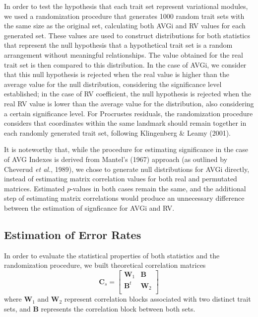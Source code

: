 \documentclass[11pt,twoside]{report}
\begin{document}
In order to test the hypothesis that each trait set represent
variational modules, we used a randomization procedure that generates
1000 random trait sets with the same size as the original set,
calculating both AVGi and RV values for each generated set. These values
are used to construct distributions for both statistics that represent
the null hypothesis that a hypothetical trait set is a random
arrangement without meaningful relationships. The value obtained for the
real trait set is then compared to this distribution. In the case of
AVGi, we consider that this null hypothesis is rejected when the real
value is higher than the average value for the null distribution,
considering the significance level established; in the case of RV
coefficient, the null hypothesis is rejected when the real RV value is
lower than the average value for the distribution, also considering a
certain significance level. For Procrustes residuals, the randomization
procedure considers that coordinates within the same landmark should
remain together in each randomly generated trait set, following
Klingenberg \& Leamy (2001).

It is noteworthy that, while the procedure for estimating significance
in the case of AVG Indexes is derived from Mantel's (1967) approach (as
outlined by Cheverud \emph{et al.}, 1989), we chose to generate null
distributions for AVGi directly, instead of estimating matrix
correlation values for both real and permutated matrices. Estimated
$p$-values in both cases remain the same, and the additional step of
estimating matrix correlations would produce an unnecessary difference
between the estimation of signficance for AVGi and RV.

\subsection{Estimation of Error Rates}\label{estimation-of-error-rates}

In order to evaluate the statistical properties of both statistics and
the randomization procedure, we built theoretical correlation matrices
\[
\mathbf{C}_{s} =
\begin{bmatrix}
\mathbf{W}_1 & \mathbf{B} \\
\mathbf{B}^t & \mathbf{W}_2 \\
\end{bmatrix}
\] where $\mathbf{W}_1$ and $\mathbf{W}_2$ represent correlation blocks
associated with two distinct trait sets, and $\mathbf{B}$ represents the
correlation block between both sets.
\end{document}
